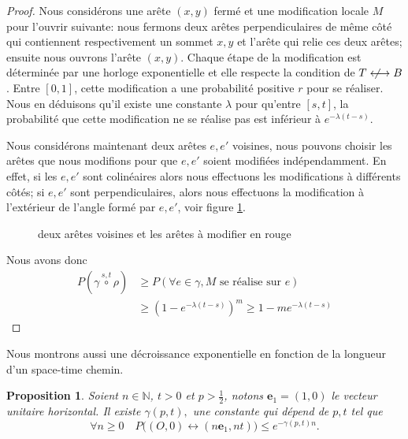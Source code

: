 \documentclass[titlepage,a4paper,12pt]{article}
\newcounter{prop}
\newtheorem{stc}[prop]{Proposition}
\newcommand{\nlongleftrightarrow}{\longleftrightarrow \kern-15pt\not \kern15pt}
\begin{document}
\begin{proof}
Nous considérons une arête $(x,y)$ fermé et une modification locale $M$ pour l'ouvrir suivante: nous fermons deux arêtes perpendiculaires de même côté qui contiennent respectivement un sommet $x,y$ et l'arête qui relie ces deux arêtes; ensuite nous ouvrons l'arête $(x,y)$. Chaque étape de la modification est déterminée par une horloge exponentielle et elle respecte la condition de $T\nlongleftrightarrow B$. Entre $[0,1]$, cette modification a une probabilité positive $r$ pour se réaliser. Nous en déduisons qu'il existe une constante $\lambda$ pour qu'entre $[s,t]$, la probabilité que cette modification ne se réalise pas est inférieur à $e^{-\lambda(t-s)}$. 

Nous considérons maintenant deux arêtes $e,e'$ voisines, nous pouvons choisir les arêtes que nous modifions pour que $e,e'$ soient modifiées indépendamment. En effet, si les $e,e'$ sont colinéaires alors nous effectuons les modifications à différents côtés; si $e,e'$ sont perpendiculaires, alors nous effectuons la modification à l'extérieur de l'angle formé par $e,e'$, voir figure \ref{fig:mod}.

\begin{figure}[h]

\begin{minipage}{0.45\linewidth}
\center
{}
\end{minipage}
\hfill
\begin{minipage}{0.45\linewidth}
\center
{}
\end{minipage}
\caption{deux arêtes voisines et les arêtes à modifier en rouge}
\label{fig:mod}

\end{figure}

Nous avons donc 
\begin{align*}
 P(\gamma \overset{s,t}{\circ} \rho) &\geqslant P(\forall e \in \gamma, M \text{ se réalise sur } e) \\
 & \geqslant (1-e^{-\lambda (t-s)})^m \geqslant 1-me^{-\lambda (t-s)}
\end{align*} 
\end{proof}
Nous montrons aussi une décroissance exponentielle en fonction de la longueur d'un space-time chemin.
\begin{stc} \label{stc} Soient $n\in \mathbb{N}$, $t>0$ et $p> \frac{1}{2}$, notons $\mathbf{e}_1 = (1,0)$ le vecteur unitaire horizontal. Il existe $\gamma(p,t),$ une constante qui dépend de $p,t$ tel que 
$$\forall n\geqslant 0 \quad P\big((O,0)\longleftrightarrow (n\mathbf{e}_1,nt)\big) \leqslant e^{-\gamma(p,t)n}.$$
\end{stc}
\end{document}
